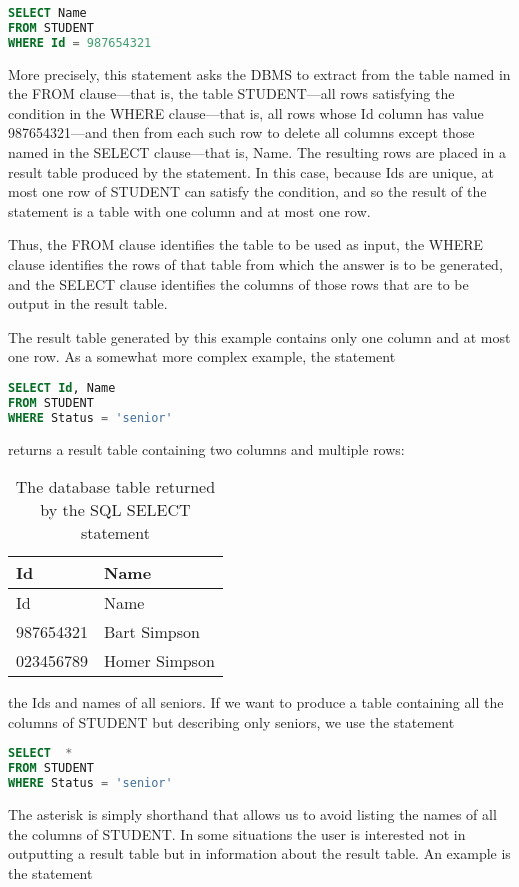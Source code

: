 \documentclass[]{article}
\begin{document}
\begin{lstlisting}[language=SQL, label=query1]
SELECT Name
FROM STUDENT 
WHERE Id = 987654321 
\end{lstlisting}

More precisely, this statement asks the DBMS to extract from the table
named in the FROM clause---that is, the table STUDENT---all rows
satisfying the condition in the WHERE clause---that is, all rows whose
Id column has value 987654321---and then from each such row to delete
all columns except those named in the SELECT clause---that is, Name. The
resulting rows are placed in a result table produced by the statement.
In this case, because Ids are unique, at most one row of STUDENT can
satisfy the condition, and so the result of the statement is a table
with one column and at most one row.

Thus, the FROM clause identifies the table to be used as input, the
WHERE clause identifies the rows of that table from which the answer is
to be generated, and the SELECT clause identifies the columns of those
rows that are to be output in the result table.

The result table generated by this example contains only one column and
at most one row. As a somewhat more complex example, the statement

\begin{lstlisting}[language=SQL]
SELECT Id, Name
FROM STUDENT 
WHERE Status = 'senior' 
\end{lstlisting}

returns a result table containing two columns and multiple rows:

\begin{longtable}[]{@{}ll@{}}
\caption{The database table returned by the SQL SELECT
statement}\tabularnewline
\toprule
Id & Name\tabularnewline
\midrule
\endfirsthead
\toprule
Id & Name\tabularnewline
\midrule
\endhead
987654321 & Bart Simpson\tabularnewline
023456789 & Homer Simpson\tabularnewline
\bottomrule
\end{longtable}

the Ids and names of all seniors. If we want to produce a table
containing all the columns of STUDENT but describing only seniors, we
use the statement

\begin{lstlisting}[language=SQL]
SELECT  *
FROM STUDENT
WHERE Status = 'senior'
\end{lstlisting}

The asterisk is simply shorthand that allows us to avoid listing the
names of all the columns of STUDENT. In some situations the user is
interested not in outputting a result table but in information about the
result table. An example is the statement
\end{document}
